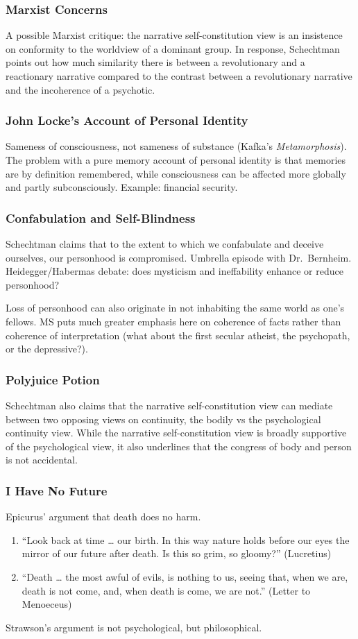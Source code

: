 \documentclass[xcolor=dvipsnames]{beamer}
\begin{document}
\begin{frame}
  \frametitle{Marxist Concerns}
  A possible Marxist critique: the narrative self-constitution view is
  an insistence on conformity to the worldview of a dominant group. In
  response, Schechtman points out how much similarity there is between
  a revolutionary and a reactionary narrative compared to the contrast
  between a revolutionary narrative and the incoherence of a psychotic.
\end{frame}

\begin{frame}
  \frametitle{John Locke's Account of Personal Identity}
  Sameness of consciousness, not sameness of substance (Kafka's
  \emph{Metamorphosis}). The problem with a pure memory account of
  personal identity is that memories are by definition remembered,
  while consciousness can be affected more globally and partly
  subconsciously. Example: financial security.
\end{frame}

\begin{frame}
  \frametitle{Confabulation and Self-Blindness}
  Schechtman claims that to the extent to which we confabulate and
  deceive ourselves, our personhood is compromised. Umbrella episode
  with Dr.\ Bernheim. Heidegger/Habermas debate: does mysticism and
  ineffability enhance or reduce personhood?

  \bigskip

  Loss of personhood can also originate in not inhabiting the same
  world as one's fellows. MS puts much greater emphasis here on
  coherence of facts rather than coherence of interpretation (what
  about the first secular atheist, the psychopath, or the
  depressive?). 
\end{frame}

\begin{frame}
  \frametitle{Polyjuice Potion}
  Schechtman also claims that the narrative self-constitution view can
  mediate between two opposing views on continuity, the bodily vs the
  psychological continuity view. While the narrative self-constitution
  view is broadly supportive of the psychological view, it also
  underlines that the congress of body and person is not accidental.
\end{frame}

\begin{frame}
  \frametitle{I Have No Future}
  Epicurus' argument that death does no harm.
  \begin{enumerate}
  \item ``Look back at time {\ldots} our birth. In this way nature
    holds before our eyes the mirror of our future after death. Is
    this so grim, so gloomy?'' (Lucretius)
  \item ``Death {\ldots} the most awful of evils, is nothing to us,
    seeing that, when we are, death is not come, and, when death is
    come, we are not.'' (Letter to Menoeceus)
  \end{enumerate}
Strawson's argument is not psychological, but philosophical. 
\end{frame}
\end{document}
